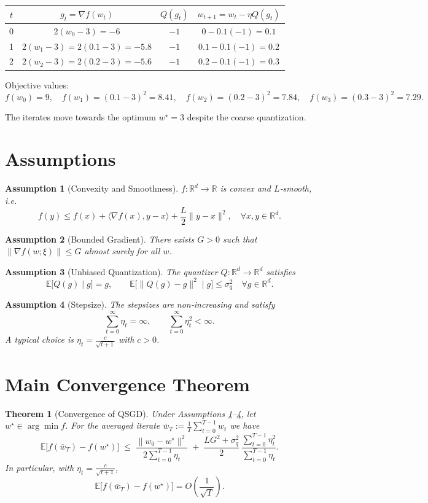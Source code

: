 \documentclass{article}
\newtheorem{theorem}{Theorem}
\newtheorem{assumption}{Assumption}
\newcommand{\E}{\mathbb{E}}
\newcommand{\R}{\mathbb{R}}
\begin{document}
\begin{center}
\begin{tabular}{c|c|c|c}
$t$ & $g_t=\nabla f(w_t)$ & $Q(g_t)$ & $w_{t+1}=w_t-\eta Q(g_t)$ \\ \hline
0 & $2(w_0-3) = -6$ & $-1$ & $0-0.1(-1)=0.1$ \\
1 & $2(w_1-3)=2(0.1-3)=-5.8$ & $-1$ & $0.1-0.1(-1)=0.2$ \\
2 & $2(w_2-3)=2(0.2-3)=-5.6$ & $-1$ & $0.2-0.1(-1)=0.3$
\end{tabular}
\end{center}

Objective values:
\[
f(w_0)=9,\quad f(w_1)= (0.1-3)^2=8.41,\quad
f(w_2)= (0.2-3)^2=7.84,\quad
f(w_3)= (0.3-3)^2=7.29 .
\]

The iterates move towards the optimum $w^{\star}=3$ despite the coarse quantization.

\section*{Assumptions}
\begin{assumption}[Convexity and Smoothness]\label{ass:convex}
$f:\R^{d}\to\R$ is convex and $L$‑smooth, i.e.
\[
f(y)\le f(x)+\langle\nabla f(x),y-x\rangle+\frac{L}{2}\|y-x\|^{2},
\quad\forall x,y\in\R^{d}.
\]
\end{assumption}
\begin{assumption}[Bounded Gradient]\label{ass:grad}
There exists $G>0$ such that $\| \nabla f(w;\xi) \| \le G$ almost surely for all $w$.
\end{assumption}
\begin{assumption}[Unbiased Quantization]\label{ass:unbiased}
The quantizer $Q:\R^{d}\to\R^{d}$ satisfies
\[
\E\!\big[Q(g)\mid g\big]=g,\qquad
\E\!\big[\|Q(g)-g\|^{2}\mid g\big]\le \sigma_{q}^{2}\quad\forall g\in\R^{d}.
\]
\end{assumption}
\begin{assumption}[Stepsize]\label{ass:stepsize}
The stepsizes are non‑increasing and satisfy
\[
\sum_{t=0}^{\infty}\eta_t =\infty,\qquad
\sum_{t=0}^{\infty}\eta_t^{2}<\infty .
\]
A typical choice is $\eta_t=\frac{c}{\sqrt{t+1}}$ with $c>0$.
\end{assumption}

\section*{Main Convergence Theorem}
\begin{theorem}[Convergence of QSGD]\label{thm:convergence}
Under Assumptions \ref{ass:convex}–\ref{ass:stepsize}, let $w^{\star}\in\arg\min f$.
For the averaged iterate $\bar w_T:=\frac{1}{T}\sum_{t=0}^{T-1}w_t$ we have
\[
\E\!\big[ f(\bar w_T)-f(w^{\star})\big]
\;\le\;
\frac{\|w_0-w^{\star}\|^{2}}{2\sum_{t=0}^{T-1}\eta_t}
\;+\;
\frac{L G^{2}+ \sigma_{q}^{2}}{2}\,
\frac{\sum_{t=0}^{T-1}\eta_t^{2}}{\sum_{t=0}^{T-1}\eta_t}.
\tag{2}
\]
In particular, with $\eta_t = \frac{c}{\sqrt{t+1}}$,
\[
\E\!\big[ f(\bar w_T)-f(w^{\star})\big]=
O\!\left(\frac{1}{\sqrt{T}}\right).
\]
\end{theorem}
\end{document}
